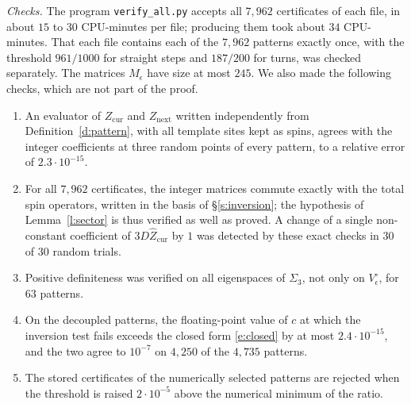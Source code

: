 \emph{Checks.} The program \texttt{verify\_all.py} accepts all $7{,}962$ certificates of each file, in about $15$ to $30$ CPU-minutes per file; producing them took about $34$ CPU-minutes. That each file contains each of the $7{,}962$ patterns exactly once, with the threshold $961/1000$ for straight steps and $187/200$ for turns, was checked separately. The matrices $M_\epsilon$ have size at most $245$. We also made the following checks, which are not part of the proof.
\begin{enumerate}
\item An evaluator of $Z_{\mathrm{cur}}$ and $Z_{\mathrm{next}}$ written independently from Definition~\ref{d:pattern}, with all template sites kept as spins, agrees with the integer coefficients at three random points of every pattern, to a relative error of $2.3 \cdot 10^{-15}$.
\item For all $7{,}962$ certificates, the integer matrices commute exactly with the total spin operators, written in the basis of \S\ref{s:inversion}; the hypothesis of Lemma~\ref{l:sector} is thus verified as well as proved. A change of a single non-constant coefficient of $3 D \hat Z_{\mathrm{cur}}$ by $1$ was detected by these exact checks in $30$ of $30$ random trials.
\item Positive definiteness was verified on all eigenspaces of $\Sigma_3$, not only on $V_\epsilon^{\circ}$, for $63$ patterns.
\item On the decoupled patterns, the floating-point value of $c$ at which the inversion test fails exceeds the closed form \eqref{e:closed} by at most $2.4 \cdot 10^{-15}$, and the two agree to $10^{-7}$ on $4{,}250$ of the $4{,}735$ patterns.
\item The stored certificates of the numerically selected patterns are rejected when the threshold is raised $2 \cdot 10^{-5}$ above the numerical minimum of the ratio.
\end{enumerate}
